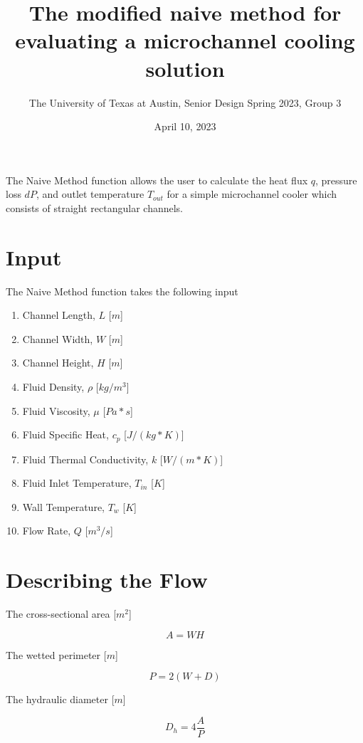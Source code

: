 \documentclass{article}
\title{The modified naive method for evaluating a microchannel cooling solution}
\author{The University of Texas at Austin, Senior Design Spring 2023, Group 3}
\date{April 10, 2023}
\begin{document}
\maketitle

The Naive Method function allows the user to calculate the heat flux $q$, pressure loss $dP$, and outlet temperature $T_{out}$ for a simple microchannel cooler which consists of straight rectangular channels.

\section{Input}

The Naive Method function takes the following input

\begin{enumerate}

\item Channel Length, $L$ [$m$]
\item Channel Width, $W$ [$m$]
\item Channel Height, $H$ [$m$]
\item Fluid Density, $\rho$ [$kg/m^3$]
\item Fluid Viscosity, $\mu$ [$Pa*s$]
\item Fluid Specific Heat, $c_p$ [$J/(kg*K)$]
\item Fluid Thermal Conductivity, $k$ [$W/(m*K)$]
\item Fluid Inlet Temperature, $T_{in}$ [$K$]
\item Wall Temperature, $T_w$ [$K$]
\item Flow Rate, $Q$ [$m^3/s$]

\end{enumerate}

\section{Describing the Flow}

The cross-sectional area [$m^2$]

\begin{equation}
	A = WH
\end{equation}

The wetted perimeter [$m$]

\begin{equation}
	P = 2(W+D)
\end{equation}

The hydraulic diameter [$m$]

\begin{equation}
	D_h = 4 \frac{A}{P}
\end{equation}
\end{document}
